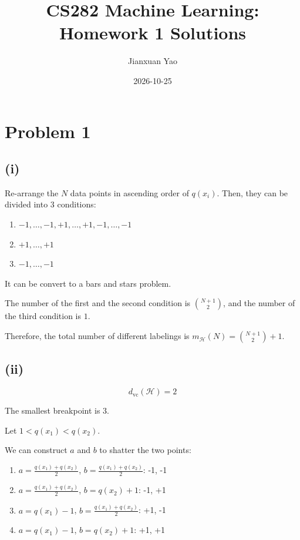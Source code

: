 \documentclass[11pt]{article}
\title{CS282 Machine Learning: Homework 1 Solutions}
\author{Jianxuan Yao}
\date{2026-10-25}
\begin{document}
\maketitle

\section*{Problem 1}

\subsection*{(i)}

Re-arrange the $N$ data points in ascending order of $q(x_i)$. Then, they can be divided into 3 conditions:

\begin{enumerate}
    \item $-1, \dots, -1, +1, \dots, +1, -1, \dots, -1$
    \item $+1, \dots, +1$
    \item $-1, \dots, -1$
\end{enumerate}

It can be convert to a bars and stars problem.

The number of the first and the second condition is $\binom{N+1}{2}$, and the number of the third condition is $1$.

Therefore, the total number of different labelings is $m_\mathcal{H}(N) = \binom{N+1}{2} + 1$.

\subsection*{(ii)}

$$
d_{\text{vc}}(\mathcal{H}) = 2
$$

The smallest breakpoint is $3$.

Let $1 < q(x_1) < q(x_2)$.

We can construct $a$ and $b$ to shatter the two points:

\begin{enumerate}
    \item $a = \frac{q(x_1) + q(x_2)}{2}$, $b = \frac{q(x_1) + q(x_2)}{2}$: -1, -1
    \item $a = \frac{q(x_1) + q(x_2)}{2}$, $b = q(x_2) + 1$: -1, +1
    \item $a = q(x_1) - 1$, $b = \frac{q(x_1) + q(x_2)}{2}$: +1, -1
    \item $a = q(x_1) - 1$, $b = q(x_2) + 1$: +1, +1
\end{enumerate}
\end{document}
